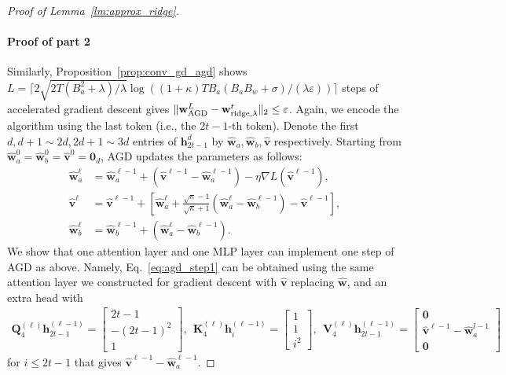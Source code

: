 \documentclass[10pt]{article}
\renewcommand{\hat}{\widehat}
\newcommand{\eps}{\varepsilon}
\newcommand{\<}{\left\langle}
\renewcommand{\>}{\right\rangle}
\renewcommand{\bQ}{\mathbf{Q}}
\newcommand{\bzero}{{\mathbf 0}}
\newcommand{\ridge}{{\rm ridge}}
\newcommand{\AGD}{{\mathrm{AGD}}}
\newcommand{\partd}{{d}}
\def\bK{{\mathbf K}}
\def\bQ{{\mathbf Q}}
\def\bV{{\mathbf V}}
\def\bh{{\mathbf h}}
\def\bv{{\mathbf v}}
\def\bw{{\mathbf w}}
\begin{document}
\begin{proof}[Proof of Lemma~\ref{lm:approx_ridge}]
\paragraph{Proof of part 2}
Similarly,  Proposition~\ref{prop:conv_gd_agd} shows $L=\lceil2\sqrt{2T(B_a^2+\lambda)/\lambda}\log((1+\kappa){TB_a(B_aB_w+\sigma)}/({\lambda}\eps))\rceil$ steps of accelerated gradient descent gives  $\|\bw^L_{\AGD}-\bw^t_{\ridge,\lambda}\|_2\leq\eps$.
Again, we encode the algorithm using the last token (i.e., the $2t-1$-th token).
Denote the first $d,d+1\sim 2d, 2d+1\sim3d $ entries of $\bh_{2t-1}^{\partd}$ by $\hat\bw_a,\hat\bw_b,\hat\bv$ respectively. Starting from $\hat\bw_a^{0}=\hat\bw_b^{0}=\hat\bv^{0}=\bzero_d$,  AGD updates the parameters as follows:
\begin{subequations}
\begin{align}
    \hat\bw^\ell_a&=\hat\bw_a^{\ell-1}+(\hat\bv^{\ell-1}-\hat\bw_a^{\ell-1})-\eta \nabla L(\hat\bv^{\ell-1}),\label{eq:agd_step1}\\
    \hat\bv^{\ell}&=\hat\bv^{\ell-1}+[\hat\bw^\ell_a+\frac{\sqrt{\kappa}-1}{\sqrt{\kappa}+1}(\hat\bw^\ell_a-\hat\bw^{\ell-1}_b)-\hat\bv^{\ell-1}],\label{eq:agd_step2}\\
    \hat\bw^\ell_b&= \hat\bw^{\ell-1}_b+( \hat\bw^\ell_a-\hat\bw^{\ell-1}_b).\label{eq:agd_step3}
\end{align}
\end{subequations}
We show that one attention layer and one MLP layer can implement one step of AGD as above. Namely, Eq.~\eqref{eq:agd_step1} can be obtained using the same attention layer we constructed for gradient descent with $\hat\bv$ replacing $\hat\bw$, and an extra head with
\begin{align*}
     \bQ_4^{(\ell)}\bh^{(\ell-1)}_{2t-1}=\begin{bmatrix}
         2t-1\\-(2t-1)^2\\ 1
    \end{bmatrix},~~ \bK_4^{(\ell)}\bh^{(\ell-1)}_{i}=\begin{bmatrix}
        1\\ 1 \\i^2
    \end{bmatrix},~~ \bV_4^{(\ell)}\bh^{(\ell-1)}_{2t-1}=\begin{bmatrix}
        \bzero\\ \hat\bv^{\ell-1}-\hat\bw_a^{l-1}\\ \bzero
    \end{bmatrix}
\end{align*} for $i\leq 2t-1$ that gives $\hat\bv^{\ell-1}-\hat\bw_a^{\ell-1}$.

\end{proof}
\end{document}
